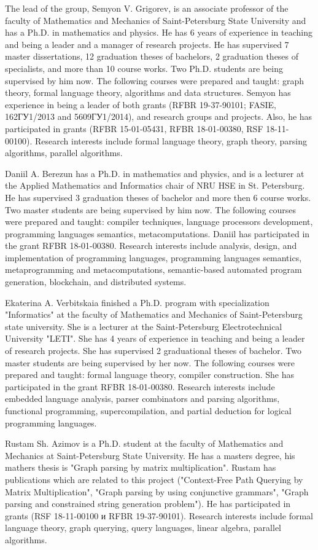 \documentclass[12pt]{article}  %
\theoremstyle{remark}
\begin{document}
The lead of the group, Semyon V. Grigorev, is an associate professor of the faculty of Mathematics and Mechanics of Saint-Petersburg State University and has a Ph.D. in mathematics and physics.
He has 6 years of experience in teaching and being a leader and a manager of research projects.
He has supervised 7 master dissertations, 12 graduation theses of bachelors, 2 graduation theses of specialists, and more than 10 course works.
Two Ph.D. students are being supervised by him now.
The following courses were prepared and taught: graph theory, formal language theory, algorithms and data structures.
Semyon has experience in being a leader of both grants  (RFBR 19-37-90101; FASIE, 162ГУ1/2013 and 5609ГУ1/2014), and research groups and projects.
Also, he has participated in grants (RFBR 15-01-05431, RFBR 18-01-00380, RSF 18-11-00100).
Research interests include formal language theory, graph theory, parsing algorithms, parallel algorithms.

Daniil A. Berezun has a Ph.D. in mathematics and physics, and is a lecturer at the Applied Mathematics and Informatics chair of NRU HSE in St. Petersburg.
He has supervised 3 graduation theses of bachelor and more then 6 course works.
Two master students are being supervised by him now.
The following courses were prepared and taught: compiler techniques, language processors development, programming languages semantics, metacomputations.
Daniil has participated in the grant RFBR 18-01-00380. Research interests include analysis, design, and implementation of programming languages, programming languages semantics, metaprogramming and metacomputations, semantic-based automated program generation, blockchain, and distributed systems.

Ekaterina A. Verbitskaia finished a Ph.D. program with specialization "Informatics" at the faculty of Mathematics and Mechanics of Saint-Petersburg state university. She is a lecturer at the Saint-Petersburg Electrotechnical University "LETI".
She has 4 years of experience in teaching and being a leader of research projects.
She has supervised 2 graduational theses of bachelor.
Two master students are being supervised by her now.
The following courses were prepared and taught: formal language theory, compiler construction.
She has participated in the grant RFBR 18-01-00380.
Research interests include embedded language analysis, parser combinators and parsing algorithms, functional programming, supercompilation, and partial deduction for logical programming languages.

Rustam Sh. Azimov is a Ph.D. student at the faculty of Mathematics and Mechanics at Saint-Petersburg State University.
He has a masters degree, his mathers thesis is "Graph parsing by matrix multiplication".
Rustam has publications which are related to this project ("Context-Free Path Querying by Matrix Multiplication", "Graph parsing by using conjunctive grammars", "Graph parsing and constrained string generation problem").
He has participated in grants (RSF 18-11-00100 и RFBR 19-37-90101).
Research interests include formal language theory, graph querying, query languages, linear algebra, parallel algorithms.
\end{document}
